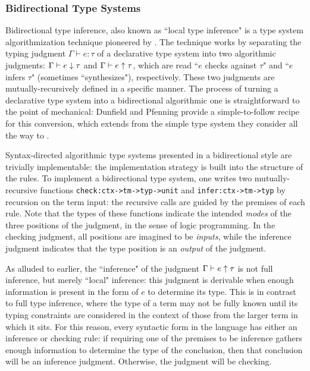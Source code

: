 \subsubsection{Bidirectional Type Systems}
\label{sec:bilambdaamor-overview-bidir}
Bidirectional type inference, also known as ``local type inference" is a type system algorithmization technique pioneered by \citet{pierce-and-turner:lti}. The technique works by separating the typing judgment $\Gamma \vdash e : \tau$ of a declarative type system into two algorithmic judgments: $\Gamma \vdash e \downarrow \tau$ and $\Gamma \vdash e \uparrow  \tau$, which are read ``$e$ checks against $\tau$" and ``$e$ infers $\tau$" (sometimes ``synthesizes"), respectively. These two judgments are mutually-recursively defined in a specific manner. The process of turning a declarative type system into a bidirectional algorithmic one is straightforward to the point of mechanical: Dunfield and Pfenning \cite{dunfield:popl04} provide a simple-to-follow recipe for this conversion, which extends from the simple type system they consider all the way to \dlambdaamor. 

Syntax-directed algorithmic type systems presented in a bidirectional style are trivially implementable: the implementation strategy is built into the structure of the rules. To implement a bidirectional type system, one writes two mutually-recursive functions \texttt{check:ctx->tm->typ->unit} and \texttt{infer:ctx->tm->typ} by recursion on the term input: the recursive calls are guided by the premises of each rule. Note that the types of these functions indicate the intended \textit{modes} of the three positions of the judgment, in the sense of logic programming. In the checking judgment, all positions are imagined to be \textit{inputs}, while the inference judgment indicates that the type position is an \textit{output} of the judgment.

As alluded to earlier, the ``inference" of the judgment $\Gamma \vdash e \uparrow \tau$ is not full inference, but merely ``local" inference: this judgment is derivable when enough information is present in the form of $e$ to determine its type. This is in contrast to full type inference, where the type of a term may not be fully known until its typing constraints are considered in the context of those from the larger term in which it sits. For this reason, every syntactic form in the language has either an inference or checking rule: if requiring one of the premises to be inference gathers enough information to determine the type of the conclusion, then that conclusion will be an inference judgment. Otherwise, the judgment will be checking.

